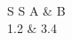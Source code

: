 \documentclass{article}
\begin{document}
\begin{tabular}{S S}
{A} & {B} \\
1.2 & 3.4 \\
\end{tabular}
\end{document}
